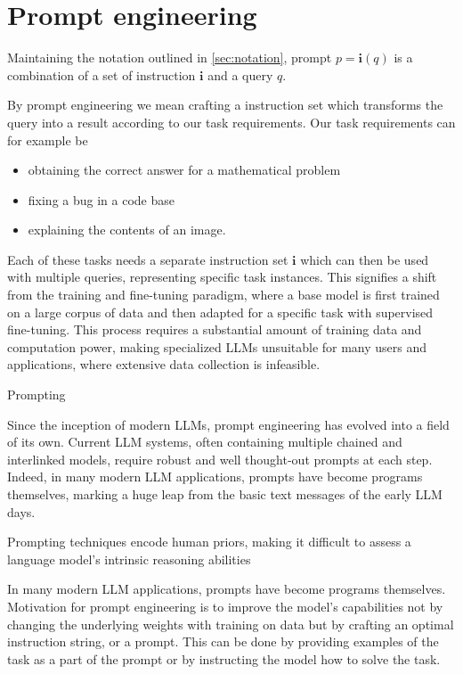 \section{Prompt engineering}
Maintaining the notation outlined in \ref{sec:notation}, prompt $p = \mathbf{i}(q)$ is a combination 
of a set of instruction $\mathbf{i}$ and a query $q$. 

By prompt engineering we mean crafting a instruction set which 
transforms the query into a result according to our task requirements.
Our task requirements can for example be
\begin{itemize}
    \item obtaining the correct answer for a mathematical problem
    \item fixing a bug in a code base
    \item explaining the contents of an image.
\end{itemize}
Each of these tasks needs a separate instruction set $\mathbf{i}$ which can then be used with multiple queries,
representing specific task instances. This signifies a shift from the training and fine-tuning paradigm, where 
a base model is first trained on a large corpus of data and then adapted for a specific task with supervised fine-tuning.
This process requires a substantial amount of training data and computation power, making specialized LLMs unsuitable
for many users and applications, where extensive data collection is infeasible.

Prompting

Since the inception of modern LLMs, prompt engineering has evolved into a field of its own. Current LLM systems, often containing
multiple chained and interlinked models, require robust and well thought-out prompts at each step. 
Indeed, in many modern LLM applications, prompts have become programs themselves\cite{schnabel2024symbolicpromptprogramsearch}, 
marking a huge leap from the basic text messages of the early LLM days.


Prompting techniques encode human priors, making it difficult to assess a language model's intrinsic reasoning abilities \cite{wang2024chainofthoughtreasoningprompting}

In many modern LLM applications, prompts have become programs themselves. \cite{schnabel2024symbolicpromptprogramsearch}
Motivation for prompt engineering is to improve the model's capabilities not by changing the underlying weights with training on data but by crafting an optimal instruction string, or a prompt.
This can be done by providing examples of the task as a part of the prompt or by instructing the model how to solve the task.

